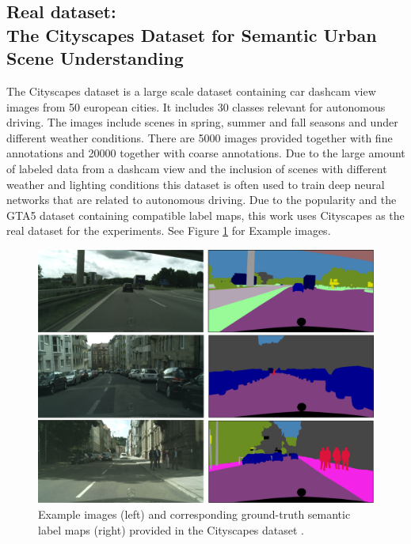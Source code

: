 \newpage

\subsection{Real dataset:\\
	The Cityscapes Dataset for Semantic Urban Scene Understanding}

The Cityscapes dataset \cite{Cordts_2016_CVPR} is a large scale dataset containing car dashcam view images from 50 european cities. It includes 30 classes relevant for autonomous driving. The images include scenes in spring, summer and fall seasons and under different weather conditions. There are 5000 images provided together with fine annotations and 20000 together with coarse annotations. Due to the large amount of labeled data from a dashcam view and the inclusion of scenes with different weather and lighting conditions this dataset is often used to train deep neural networks that are related to autonomous driving. Due to the popularity and the GTA5 dataset containing compatible label maps, this work uses Cityscapes as the real dataset for the experiments. See Figure \ref{fig:cityscapes_examples} for Example images.

\begin{figure}
	\centering
	\includegraphics[width=\textwidth]{images/cityscapes_example.png}
	\caption{Example images (left) and corresponding ground-truth semantic label maps (right) provided in the Cityscapes dataset \cite{Cordts_2016_CVPR}.}
	\label{fig:cityscapes_examples}
\end{figure}

